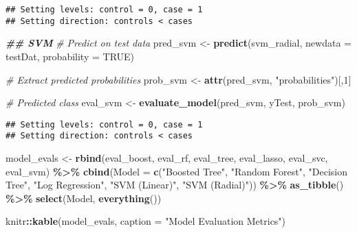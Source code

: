 \documentclass[
]{article}
\newenvironment{Shaded}{\begin{snugshade}}{\end{snugshade}}
\newcommand{\AttributeTok}[1]{\textcolor[rgb]{0.13,0.29,0.53}{#1}}
\newcommand{\CommentTok}[1]{\textcolor[rgb]{0.56,0.35,0.01}{\textit{#1}}}
\newcommand{\ConstantTok}[1]{\textcolor[rgb]{0.56,0.35,0.01}{#1}}
\newcommand{\DecValTok}[1]{\textcolor[rgb]{0.00,0.00,0.81}{#1}}
\newcommand{\DocumentationTok}[1]{\textcolor[rgb]{0.56,0.35,0.01}{\textbf{\textit{#1}}}}
\newcommand{\FunctionTok}[1]{\textcolor[rgb]{0.13,0.29,0.53}{\textbf{#1}}}
\newcommand{\NormalTok}[1]{#1}
\newcommand{\OtherTok}[1]{\textcolor[rgb]{0.56,0.35,0.01}{#1}}
\newcommand{\SpecialCharTok}[1]{\textcolor[rgb]{0.81,0.36,0.00}{\textbf{#1}}}
\newcommand{\StringTok}[1]{\textcolor[rgb]{0.31,0.60,0.02}{#1}}
\begin{document}
\begin{verbatim}
## Setting levels: control = 0, case = 1
## Setting direction: controls < cases
\end{verbatim}

\begin{Shaded}
\begin{Highlighting}[]
\DocumentationTok{\#\# SVM}
\CommentTok{\# Predict on test data}
\NormalTok{pred\_svm }\OtherTok{\textless{}{-}} \FunctionTok{predict}\NormalTok{(svm\_radial, }\AttributeTok{newdata =}\NormalTok{ testDat, }\AttributeTok{probability =} \ConstantTok{TRUE}\NormalTok{)}

\CommentTok{\# Extract predicted probabilities}
\NormalTok{prob\_svm }\OtherTok{\textless{}{-}} \FunctionTok{attr}\NormalTok{(pred\_svm, }\StringTok{"probabilities"}\NormalTok{)[,}\DecValTok{1}\NormalTok{]}

\CommentTok{\# Predicted class}
\NormalTok{eval\_svm }\OtherTok{\textless{}{-}} \FunctionTok{evaluate\_model}\NormalTok{(pred\_svm, yTest, prob\_svm)}
\end{Highlighting}
\end{Shaded}

\begin{verbatim}
## Setting levels: control = 0, case = 1
## Setting direction: controls < cases
\end{verbatim}

\begin{Shaded}
\begin{Highlighting}[]
\NormalTok{model\_evals }\OtherTok{\textless{}{-}} \FunctionTok{rbind}\NormalTok{(eval\_boost, eval\_rf, eval\_tree, eval\_lasso, eval\_svc, eval\_svm) }\SpecialCharTok{\%\textgreater{}\%}
  \FunctionTok{cbind}\NormalTok{(}\AttributeTok{Model =} \FunctionTok{c}\NormalTok{(}\StringTok{"Boosted Tree"}\NormalTok{, }\StringTok{"Random Forest"}\NormalTok{, }\StringTok{"Decision Tree"}\NormalTok{, }\StringTok{"Log Regression"}\NormalTok{, }\StringTok{"SVM (Linear)"}\NormalTok{, }\StringTok{"SVM (Radial)"}\NormalTok{)) }\SpecialCharTok{\%\textgreater{}\%}
\FunctionTok{as\_tibble}\NormalTok{() }\SpecialCharTok{\%\textgreater{}\%}
\FunctionTok{select}\NormalTok{(Model, }\FunctionTok{everything}\NormalTok{())}
\end{Highlighting}
\end{Shaded}

\begin{Shaded}
\begin{Highlighting}[]
\NormalTok{knitr}\SpecialCharTok{::}\FunctionTok{kable}\NormalTok{(model\_evals, }\AttributeTok{caption =} \StringTok{"Model Evaluation Metrics"}\NormalTok{)}
\end{Highlighting}
\end{Shaded}
\end{document}
